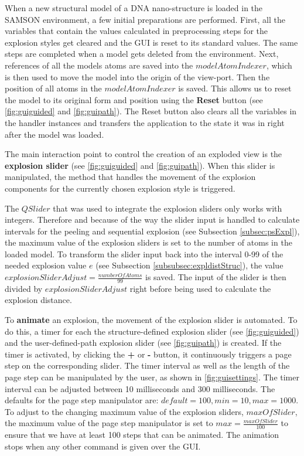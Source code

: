\documentclass[draft,final]{vutinfth} %
\begin{document}
When a new structural model of a DNA nano-structure is loaded in the SAMSON environment, a few initial preparations are performed. First, all the variables that contain the values calculated in preprocessing steps for the explosion styles get cleared and the GUI is reset to its standard values. The same steps are completed when a model gets deleted from the environment.
Next, references of all the models atoms are saved into the $modelAtomIndexer$, which is then used to move the model into the origin of the view-port. Then the position of all atoms in the $modelAtomIndexer$ is saved. This allows us to reset the model to its original form and position using the \textbf{Reset} button (see \autoref{fig:guiguided} and \autoref{fig:guipath}). The Reset button also clears all the variables in the handler instances and transfers the application to the state it was in right after the model was loaded.

\par The main interaction point to control the creation of an exploded view is the \textbf{explosion slider} (see \autoref{fig:guiguided} and \autoref{fig:guipath}). When this slider is manipulated, the method that handles the movement of the explosion components for the currently chosen explosion style is triggered.

\par The $QSlider$ that was used to integrate the explosion sliders only works with integers. Therefore and because of the way the slider input is handled to calculate intervals for the peeling and sequential explosion (see Subsection \ref{subsec:psExpl}), the maximum value of the explosion sliders is set to the number of atoms in the loaded model. To transform the slider input back into the interval 0-99 of the needed explosion value $e$ (see Subsection \ref{subsubsec:expldistStruc}), the value $explosionSliderAdjust = \frac{numberOfAtoms}{99}$ is saved. The input of the slider is then divided by $explosionSliderAdjust$ right before being used to calculate the explosion distance.

\par To \textbf{animate} an explosion, the movement of the explosion slider is automated. To do this, a timer for each the structure-defined explosion slider (see \autoref{fig:guiguided}) and the user-defined-path explosion slider (see \autoref{fig:guipath}) is created. If the timer is activated, by clicking the \textbf{+} or \textbf{-} button, it continuously triggers a page step on the corresponding slider. The timer interval as well as the length of the page step can be manipulated by the user, as shown in \autoref{fig:guisettings}. The timer interval can be adjusted between 10 milliseconds and 300 milliseconds. The defaults for the page step manipulator are: $default = 100, min = 10, max = 1000$. To adjust to the changing maximum value of the explosion sliders, $maxOfSlider$, the maximum value of the page step manipulator is set to $max = \frac{maxOfSlider}{100}$ to ensure that we have at least 100 steps that can be animated. The animation stops when any other command is given over the GUI.
\end{document}
